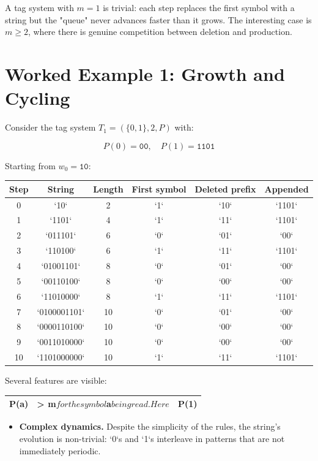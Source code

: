 \begin{remark}
A tag system with $m = 1$ is trivial: each step replaces the first symbol with a string but the "queue" never advances faster than it grows. The interesting case is $m \geq 2$, where there is genuine competition between deletion and production.
\end{remark}

\section{Worked Example 1: Growth and Cycling}

Consider the tag system $T_1 = (\{ 0, 1\} , 2, P)$ with:

\[P(0) = \texttt{00}, \quad P(1) = \texttt{1101}\]

Starting from $w_0 = \texttt{10}$:

\begin{center}
\begin{tabular}{cccccc}
\toprule
Step & String & Length & First symbol & Deleted prefix & Appended \\
\midrule
0 & `10` & 2 & `1` & `10` & `1101` \\
1 & `1101` & 4 & `1` & `11` & `1101` \\
2 & `011101` & 6 & `0` & `01` & `00` \\
3 & `110100` & 6 & `1` & `11` & `1101` \\
4 & `01001101` & 8 & `0` & `01` & `00` \\
5 & `00110100` & 8 & `0` & `00` & `00` \\
6 & `11010000` & 8 & `1` & `11` & `1101` \\
7 & `0100001101` & 10 & `0` & `01` & `00` \\
8 & `0000110100` & 10 & `0` & `00` & `00` \\
9 & `0011010000` & 10 & `0` & `00` & `00` \\
10 & `1101000000` & 10 & `1` & `11` & `1101` \\
\bottomrule
\end{tabular}
\end{center}

Several features are visible:

\begin{center}
\begin{tabular}{ccc}
\toprule
P(a) & > m$ for the symbol $a$ being read. Here $ & P(1) \\
\midrule
\bottomrule
\end{tabular}
\end{center}
\begin{itemize}
\item \textbf{Complex dynamics.} Despite the simplicity of the rules, the string's evolution is non-trivial: `0`s and `1`s interleave in patterns that are not immediately periodic.
\end{itemize}

